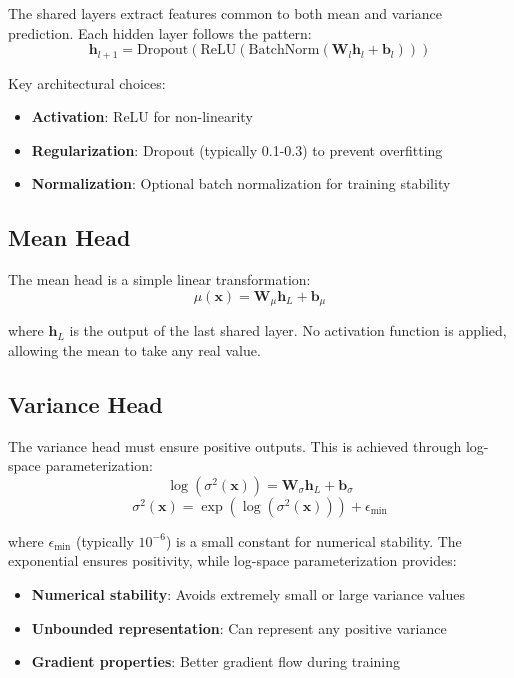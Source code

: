 \documentclass[11pt,a4paper]{article}
\begin{document}
The shared layers extract features common to both mean and variance prediction. Each hidden layer follows the pattern:
\begin{equation}
\mathbf{h}_{l+1} = \text{Dropout}(\text{ReLU}(\text{BatchNorm}(\mathbf{W}_l \mathbf{h}_l + \mathbf{b}_l)))
\end{equation}

Key architectural choices:
\begin{itemize}
    \item \textbf{Activation}: ReLU for non-linearity
    \item \textbf{Regularization}: Dropout (typically 0.1-0.3) to prevent overfitting
    \item \textbf{Normalization}: Optional batch normalization for training stability
\end{itemize}

\subsection{Mean Head}

The mean head is a simple linear transformation:
\begin{equation}
\mu(\mathbf{x}) = \mathbf{W}_\mu \mathbf{h}_L + \mathbf{b}_\mu
\end{equation}

where $\mathbf{h}_L$ is the output of the last shared layer. No activation function is applied, allowing the mean to take any real value.

\subsection{Variance Head}

The variance head must ensure positive outputs. This is achieved through log-space parameterization:
\begin{equation}
\log(\sigma^2(\mathbf{x})) = \mathbf{W}_\sigma \mathbf{h}_L + \mathbf{b}_\sigma
\end{equation}
\begin{equation}
\sigma^2(\mathbf{x}) = \exp(\log(\sigma^2(\mathbf{x}))) + \epsilon_{\min}
\end{equation}

where $\epsilon_{\min}$ (typically $10^{-6}$) is a small constant for numerical stability. The exponential ensures positivity, while log-space parameterization provides:
\begin{itemize}
    \item \textbf{Numerical stability}: Avoids extremely small or large variance values
    \item \textbf{Unbounded representation}: Can represent any positive variance
    \item \textbf{Gradient properties}: Better gradient flow during training
\end{itemize}
\end{document}
